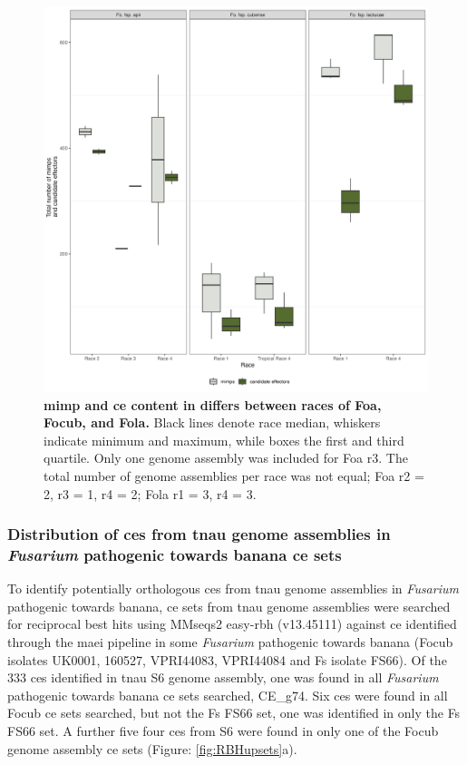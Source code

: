 \bigskip
\begin{figure}[ht!]
    \centering
    \includegraphics[width=\textwidth]{Figures/MimpsAndCandEffs_FspOfInterest.png}
    \caption[Boxplot of \ac{ce} and \ac{mimp} content in difference races of \ac{Foa}, \ac{Focub}, and \ac{Fola}.]{\textbf{\Acf{mimp} and \acf{ce} content in differs between races of \ac{Foa}, \ac{Focub}, and \ac{Fola}.} Black lines denote race median, whiskers indicate minimum and maximum, while boxes the first and third quartile. Only one genome assembly was included for \ac{Foa} \ac{r3}. The total number of genome assemblies per race was not equal; \ac{Foa} \ac{r2} = 2, \ac{r3} = 1, \ac{r4} = 2; \ac{Fola} \ac{r1} = 3, \ac{r4} = 3.}
    \label{fig:MaeiBoxPlot}
\end{figure}
\bigskip

\subsubsection{Distribution of \aclp{ce} from \ac{tnau} genome assemblies in \textit{Fusarium} pathogenic towards banana \ac{ce} sets}

To identify potentially orthologous \acp{ce} from \ac{tnau} genome assemblies in \textit{Fusarium} pathogenic towards banana, \ac{ce} sets from \ac{tnau} genome assemblies were searched for reciprocal best hits using MMseqs2 easy-rbh (v13.45111) against \ac{ce} identified through the \ac{maei} pipeline in some \textit{Fusarium} pathogenic towards banana  (\ac{Focub} isolates UK0001, 160527, VPRI44083, VPRI44084 and \ac{Fs} isolate FS66). Of the 333 \acp{ce} identified in \ac{tnau} S6 genome assembly, one was found in all \textit{Fusarium} pathogenic towards banana \ac{ce} sets searched, CE\_g74. Six \acp{ce} were found in all \ac{Focub} \ac{ce} sets searched, but not the \ac{Fs} FS66 set, one was identified in only the \ac{Fs} FS66 set. A further five four \acp{ce} from S6 were found in only one of the \ac{Focub} genome assembly \ac{ce} sets (Figure: \ref{fig:RBHupsets}a). 

